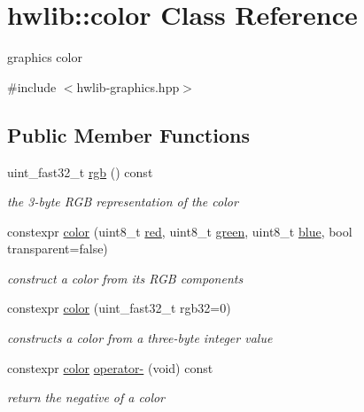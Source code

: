 \hypertarget{classhwlib_1_1color}{}\section{hwlib\+:\+:color Class Reference}
\label{classhwlib_1_1color}


graphics color  




{\ttfamily \#include $<$hwlib-\/graphics.\+hpp$>$}

\subsection*{Public Member Functions}
\begin{DoxyCompactItemize}
\item 
uint\+\_\+fast32\+\_\+t \hyperlink{classhwlib_1_1color_a845e1e2526d372640adb44cf98e8f3f4}{rgb} () const
\begin{DoxyCompactList}\small\item\em the 3-\/byte R\+GB representation of the color \end{DoxyCompactList}\item 
constexpr \hyperlink{classhwlib_1_1color_a028860f5b8005968cd5e175a7d297b7a}{color} (uint8\+\_\+t \hyperlink{classhwlib_1_1color_a63b0cdaa1bc446995cc8b8724a2ab866}{red}, uint8\+\_\+t \hyperlink{classhwlib_1_1color_ab87f25b9aba71151e056b570e7304c89}{green}, uint8\+\_\+t \hyperlink{classhwlib_1_1color_a9d57edec257fb2626157befb791a6a96}{blue}, bool transparent=false)
\begin{DoxyCompactList}\small\item\em construct a color from its R\+GB components \end{DoxyCompactList}\item 
constexpr \hyperlink{classhwlib_1_1color_aa8d2263ebf5efe2221171217166a669f}{color} (uint\+\_\+fast32\+\_\+t rgb32=0)
\begin{DoxyCompactList}\small\item\em constructs a color from a three-\/byte integer value \end{DoxyCompactList}\item 
\mbox{\label{classhwlib_1_1color_a6461f61a4b0e1b5058b765eed55aeec7}} 
constexpr \hyperlink{classhwlib_1_1color}{color} \hyperlink{classhwlib_1_1color_a6461f61a4b0e1b5058b765eed55aeec7}{operator-\/} (void) const
\begin{DoxyCompactList}\small\item\em return the negative of a color \end{DoxyCompactList}\item 

\end{DoxyCompactItemize}
